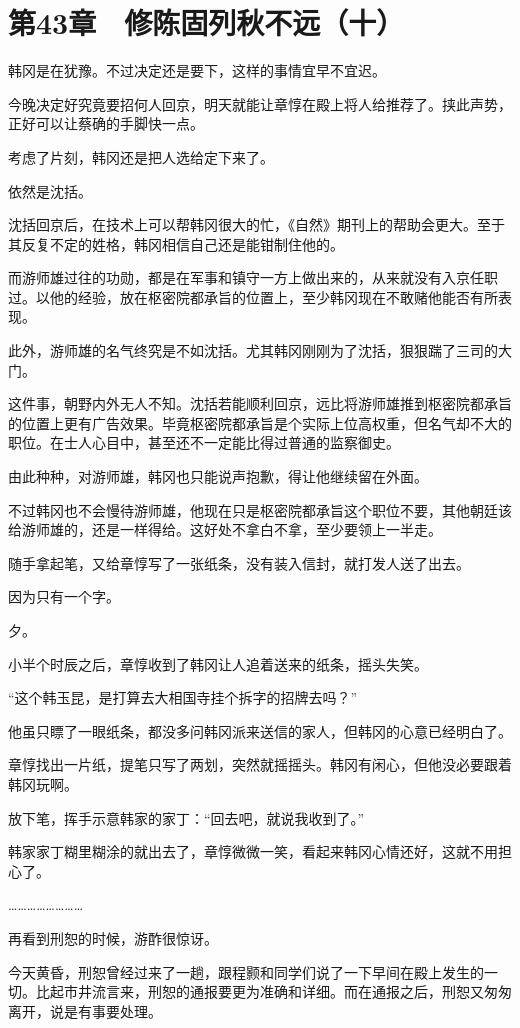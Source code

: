 \section{第43章　修陈固列秋不远（十）}

韩冈是在犹豫。不过决定还是要下，这样的事情宜早不宜迟。

今晚决定好究竟要招何人回京，明天就能让章惇在殿上将人给推荐了。挟此声势，正好可以让蔡确的手脚快一点。

考虑了片刻，韩冈还是把人选给定下来了。

依然是沈括。

沈括回京后，在技术上可以帮韩冈很大的忙，《自然》期刊上的帮助会更大。至于其反复不定的姓格，韩冈相信自己还是能钳制住他的。

而游师雄过往的功勋，都是在军事和镇守一方上做出来的，从来就没有入京任职过。以他的经验，放在枢密院都承旨的位置上，至少韩冈现在不敢赌他能否有所表现。

此外，游师雄的名气终究是不如沈括。尤其韩冈刚刚为了沈括，狠狠踹了三司的大门。

这件事，朝野内外无人不知。沈括若能顺利回京，远比将游师雄推到枢密院都承旨的位置上更有广告效果。毕竟枢密院都承旨是个实际上位高权重，但名气却不大的职位。在士人心目中，甚至还不一定能比得过普通的监察御史。

由此种种，对游师雄，韩冈也只能说声抱歉，得让他继续留在外面。

不过韩冈也不会慢待游师雄，他现在只是枢密院都承旨这个职位不要，其他朝廷该给游师雄的，还是一样得给。这好处不拿白不拿，至少要领上一半走。

随手拿起笔，又给章惇写了一张纸条，没有装入信封，就打发人送了出去。

因为只有一个字。

夕。

小半个时辰之后，章惇收到了韩冈让人追着送来的纸条，摇头失笑。

“这个韩玉昆，是打算去大相国寺挂个拆字的招牌去吗？”

他虽只瞟了一眼纸条，都没多问韩冈派来送信的家人，但韩冈的心意已经明白了。

章惇找出一片纸，提笔只写了两划，突然就摇摇头。韩冈有闲心，但他没必要跟着韩冈玩啊。

放下笔，挥手示意韩家的家丁：“回去吧，就说我收到了。”

韩家家丁糊里糊涂的就出去了，章惇微微一笑，看起来韩冈心情还好，这就不用担心了。

……………………

再看到刑恕的时候，游酢很惊讶。

今天黄昏，刑恕曾经过来了一趟，跟程颢和同学们说了一下早间在殿上发生的一切。比起市井流言来，刑恕的通报要更为准确和详细。而在通报之后，刑恕又匆匆离开，说是有事要处理。


